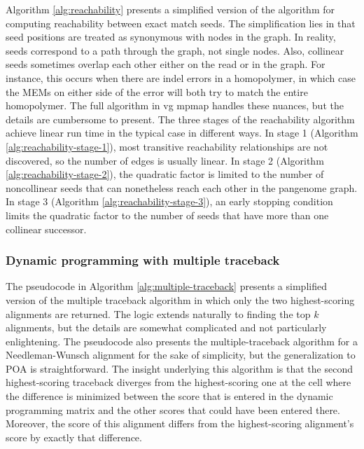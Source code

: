 \documentclass[11pt]{ucthesis}
\begin{document}
Algorithm \ref{alg:reachability} presents a simplified version of the algorithm for computing reachability between exact match seeds. The simplification lies in that seed positions are treated as synonymous with nodes in the graph. In reality, seeds correspond to a path through the graph, not single nodes. Also, collinear seeds sometimes overlap each other either on the read or in the graph. For instance, this occurs when there are indel errors in a homopolymer, in which case the MEMs on either side of the error will both try to match the entire homopolymer. The full algorithm in vg mpmap handles these nuances, but the details are cumbersome to present.
The three stages of the reachability algorithm achieve linear run time in the typical case in different ways. In stage 1 (Algorithm \ref{alg:reachability-stage-1}), most transitive reachability relationships are not discovered, so the number of edges is usually linear. In stage 2 (Algorithm \ref{alg:reachability-stage-2}), the quadratic factor is limited to the number of noncollinear seeds that can nonetheless reach each other in the pangenome graph. In stage 3 (Algorithm \ref{alg:reachability-stage-3}), an early stopping condition limits the quadratic factor to the number of seeds that have more than one collinear successor.

\subsubsection{Dynamic programming with multiple traceback}

The pseudocode in Algorithm \ref{alg:multiple-traceback} presents a simplified version of the multiple traceback algorithm in which only the two highest-scoring alignments are returned. The logic extends naturally to finding the top $k$ alignments, but the details are somewhat complicated and not particularly enlightening. The pseudocode also presents the multiple-traceback algorithm for a Needleman-Wunsch alignment for the sake of simplicity, but the generalization to POA is straightforward. The insight underlying this algorithm is that the second highest-scoring traceback diverges from the highest-scoring one at the cell where the difference is minimized between the score that is entered in the dynamic programming matrix and the other scores that could have been entered there. Moreover, the score of this alignment differs from the highest-scoring alignment’s score by exactly that difference.
\end{document}
